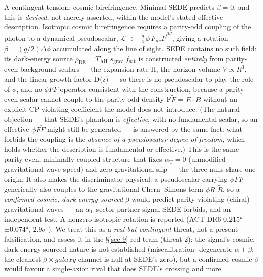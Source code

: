 \documentclass[preprint,12pt]{elsarticle}
\begin{document}
A contingent tension: cosmic birefringence. Minimal SEDE predicts
\(\beta  = 0\), and this is \emph{derived}, not merely asserted, within
the model's stated effective description. Isotropic cosmic birefringence
requires a parity-odd coupling of the photon to a dynamical
pseudoscalar,
\(\mathcal{L} \supset -\tfrac{g}{4}\,\phi\,F_{\mu\nu}\tilde F^{\mu\nu}\),
giving a rotation \(\beta  = (g/2)\Delta \phi\) accumulated along the
line of sight. SEDE contains no such field: its dark-energy source
\(\rho _\mathrm{DE} = T_\mathrm{AH}\) \(s_{\mathrm{grav}}\)
\(f_{\mathrm{sat}}\) is constructed \emph{entirely} from parity-even
background scalars --- the expansion rate H, the horizon volume
\(V \propto  R^{3}\), and the linear growth factor D(z) --- so there is
no pseudoscalar to play the role of \(\phi\), and no
\(\phi F\)\(\tilde{F}\) operator consistent with the construction,
because a parity-even scalar cannot couple to the parity-odd density
F\(\tilde{F}\) = \(E\cdot B\) without an explicit CP-violating
coefficient the model does not introduce. (The natural objection ---
that SEDE's phantom is \emph{effective}, with no fundamental scalar, so
an effective \(\phi F\)\(\tilde{F}\) might still be generated --- is
answered by the same fact: what forbids the coupling is the
\emph{absence of a pseudoscalar degree of freedom}, which holds whether
the description is fundamental or effective.) This is the same
parity-even, minimally-coupled structure that fixes
\(\alpha _{\mathrm{T}} = 0\) (unmodified gravitational-wave speed) and
zero gravitational slip --- the three nulls share one origin. It also
makes the discriminator physical: a pseudoscalar carrying
\(\phi F\)\(\tilde{F}\) generically also couples to the gravitational
Chern--Simons term \(\phi R\) \(\tilde{R}\), so a \emph{confirmed
cosmic, dark-energy-sourced} \(\beta\) would predict parity-violating
(chiral) gravitational waves --- an \(\alpha _{\mathrm{T}}\)-sector
partner signal SEDE forbids, and an independent test. A nonzero
isotropic rotation is reported (ACT DR6 0.215°±0.074°, \(2.9\sigma\)
\citep{Diego-Palazuelos:2025dmh}). We treat this as a
\emph{real-but-contingent} threat, not a present falsification, and
assess it in the §\ref{sec-9} red-team (threat 2): the signal's cosmic,
dark-energy-sourced nature is not established (miscalibration-
degenerate \(\alpha +\beta\); the cleanest \(\beta \times galaxy\)
channel is null at SEDE's zero), but a confirmed cosmic \(\beta\) would
favour a single-axion rival that does SEDE's crossing and more.
\end{document}
